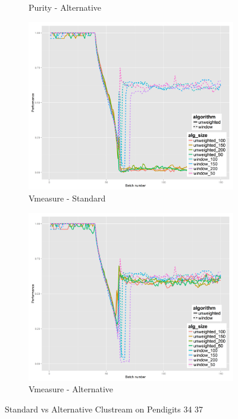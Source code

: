 \begin{figure}[h]
\begin{subfigure}[b]{0.47\textwidth}
                \caption{Purity - Alternative}
                \label{fig:pa_3437}
        \end{subfigure}
        \begin{subfigure}[b]{0.47\textwidth}
          \includegraphics[width=\textwidth]{standard_alt/ci_evolving_pen_34_37_standard_vmeasure.png}
                 \caption{Vmeasure - Standard}
                 \label{fig:vs_3437}
        \end{subfigure}
        \begin{subfigure}[b]{0.47\textwidth}
                 \includegraphics[width=\textwidth]{standard_alt/ci_evolving_pen_34_37_alternative_vmeasure.png}
                \caption{Vmeasure - Alternative}
                \label{fig:va_3437}
        \end{subfigure}
\caption{Standard vs Alternative Clustream on Pendigits 34 37}
\label{fig:standard_alternative_3437}
\end{figure}

